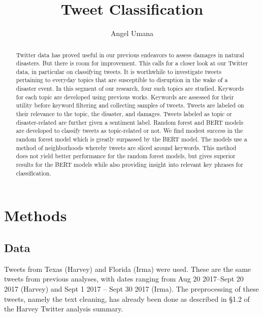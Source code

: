 \documentclass[12pt, a4paper]{article}
\title{Tweet Classification}
\author{Angel Umana}
\date{}
\begin{document}
\maketitle

\begin{abstract}
    Twitter data has proved useful in our previous endeavors to assess damages in natural disasters. But there is room for improvement. This calls for a closer look at our Twitter data, in particular on classifying tweets. It is worthwhile to investigate tweets pertaining to everyday topics that are susceptible to disruption in the wake of a disaster event. In this segment of our research, four such topics are studied. Keywords for each topic are developed using previous works. Keywords are assessed for their utility before keyword filtering and collecting samples of tweets. Tweets are labeled on their relevance to the topic, the disaster, and damages. Tweets labeled as topic or disaster-related are further given a sentiment label. Random forest and BERT models are developed to classify tweets as topic-related or not. We find modest success in the random forest model which is greatly surpassed by the BERT model. The models use a method of neighborhoods whereby tweets are sliced around keywords. This method does not yield better performance for the random forest models, but gives superior results for the BERT models while also providing insight into relevant key phrases for classification.
\end{abstract}
\section{Methods}

\subsection{Data}
    Tweets from Texas (Harvey) and Florida (Irma) were used. These are the same tweets from previous analyses, with dates ranging from Aug 20 2017--Sept 20 2017 (Harvey) and Sept 1 2017 -- Sept 30 2017 (Irma). The preprocessing of these tweets, namely the text cleaning, has already been done as described in \S 1.2 of the Harvey Twitter analysis summary. 
    
\end{document}
